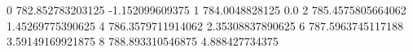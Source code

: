 0 782.852783203125 -1.152099609375
1 784.0048828125 0.0
2 785.4575805664062 1.45269775390625
4 786.3579711914062 2.35308837890625
6 787.5963745117188 3.59149169921875
8 788.893310546875 4.888427734375
